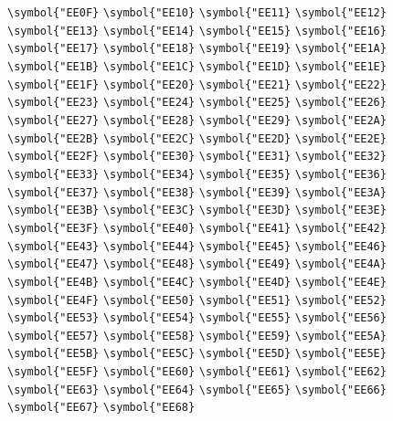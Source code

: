 \documentclass{ctexbook}
\begin{document}
{\verb|\symbol{"EE0F}|  \verb|\symbol{"EE10}|  \verb|\symbol{"EE11}|  \verb|\symbol{"EE12}|  \verb|\symbol{"EE13}|  \verb|\symbol{"EE14}|  \verb|\symbol{"EE15}|  \verb|\symbol{"EE16}|  \verb|\symbol{"EE17}|  \verb|\symbol{"EE18}|  \verb|\symbol{"EE19}|  \verb|\symbol{"EE1A}|  \verb|\symbol{"EE1B}|  \verb|\symbol{"EE1C}|  \verb|\symbol{"EE1D}|  \verb|\symbol{"EE1E}|  \verb|\symbol{"EE1F}|  \verb|\symbol{"EE20}|  \verb|\symbol{"EE21}|  \verb|\symbol{"EE22}|  \verb|\symbol{"EE23}|  \verb|\symbol{"EE24}|  \verb|\symbol{"EE25}|  \verb|\symbol{"EE26}|  \verb|\symbol{"EE27}|  \verb|\symbol{"EE28}|  \verb|\symbol{"EE29}|  \verb|\symbol{"EE2A}|  \verb|\symbol{"EE2B}|  \verb|\symbol{"EE2C}|  \verb|\symbol{"EE2D}|  \verb|\symbol{"EE2E}|  \verb|\symbol{"EE2F}|  \verb|\symbol{"EE30}|  \verb|\symbol{"EE31}|  \verb|\symbol{"EE32}|  \verb|\symbol{"EE33}|  \verb|\symbol{"EE34}|  \verb|\symbol{"EE35}|  \verb|\symbol{"EE36}|  \verb|\symbol{"EE37}|  \verb|\symbol{"EE38}|  \verb|\symbol{"EE39}|  \verb|\symbol{"EE3A}|  \verb|\symbol{"EE3B}|  \verb|\symbol{"EE3C}|  \verb|\symbol{"EE3D}|  \verb|\symbol{"EE3E}|  \verb|\symbol{"EE3F}|  \verb|\symbol{"EE40}|  \verb|\symbol{"EE41}|  \verb|\symbol{"EE42}|  \verb|\symbol{"EE43}|  \verb|\symbol{"EE44}|  \verb|\symbol{"EE45}|  \verb|\symbol{"EE46}|  \verb|\symbol{"EE47}|  \verb|\symbol{"EE48}|  \verb|\symbol{"EE49}|  \verb|\symbol{"EE4A}|  \verb|\symbol{"EE4B}|  \verb|\symbol{"EE4C}|  \verb|\symbol{"EE4D}|  \verb|\symbol{"EE4E}|  \verb|\symbol{"EE4F}|  \verb|\symbol{"EE50}|  \verb|\symbol{"EE51}|  \verb|\symbol{"EE52}|  \verb|\symbol{"EE53}|  \verb|\symbol{"EE54}|  \verb|\symbol{"EE55}|  \verb|\symbol{"EE56}|  \verb|\symbol{"EE57}|  \verb|\symbol{"EE58}|  \verb|\symbol{"EE59}|  \verb|\symbol{"EE5A}|  \verb|\symbol{"EE5B}|  \verb|\symbol{"EE5C}|  \verb|\symbol{"EE5D}|  \verb|\symbol{"EE5E}|  \verb|\symbol{"EE5F}|  \verb|\symbol{"EE60}|  \verb|\symbol{"EE61}|  \verb|\symbol{"EE62}|  \verb|\symbol{"EE63}|  \verb|\symbol{"EE64}|  \verb|\symbol{"EE65}|  \verb|\symbol{"EE66}|  \verb|\symbol{"EE67}|  \verb|\symbol{"EE68}|  }
\end{document}
